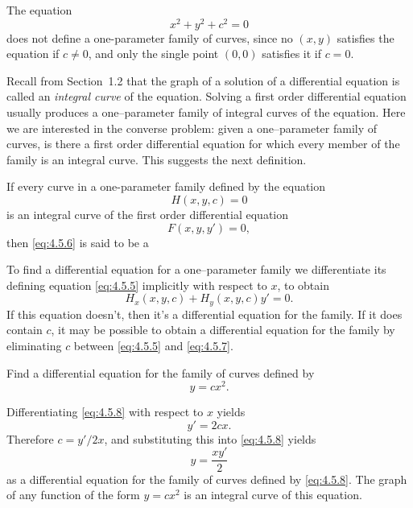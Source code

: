 \documentclass{ximera}
\begin{document}
\begin{example}\label{example:4.5.4}
 The equation
$$
x^2+y^2+c^2=0
$$
does not define a one-parameter family of curves, since no $(x,y)$
satisfies the equation if $c\neq 0$, and only the single point $(0,0)$
satisfies it if $c=0$.
\end{example}

Recall from Section~1.2 that the graph of a solution of a
differential equation is called an \textit{integral curve} of the
equation. Solving a first order differential equation usually produces
a one--parameter family of integral curves of the equation. Here we
are interested in the converse problem:
given a one--parameter family of curves, is there a first order
differential equation for which every  member of the family is an integral
curve.
This suggests the next definition.

\begin{definition}\label{thmtype:4.5.2}
If every curve in a one-parameter family defined by the equation
\begin{equation} \label{eq:4.5.5}
H(x,y,c)=0
\end{equation}
is an integral curve of the first order differential equation
\begin{equation} \label{eq:4.5.6}
F(x,y,y')=0,
\end{equation}
then  \eqref{eq:4.5.6} is said to be a 
\end{definition}

To find a differential equation for a one--parameter family we
differentiate its defining equation \eqref{eq:4.5.5} implicitly with
respect to $x$, to obtain
\begin{equation} \label{eq:4.5.7}
H_x(x,y,c)+H_y(x,y,c)y'=0.
\end{equation}
If this equation doesn't, then it's a differential
equation for the family. If it does contain $c$, it may be
possible to obtain a differential equation for the family by
eliminating $c$ between \eqref{eq:4.5.5} and \eqref{eq:4.5.7}.

\begin{example}\label{example:4.5.5}
Find a differential equation for the family of curves defined by
\begin{equation}  \label{eq:4.5.8}
y=cx^2.
\end{equation}


\begin{explanation} Differentiating
\eqref{eq:4.5.8} with respect to $x$ yields
$$
y'=2cx.
$$
 Therefore $c=y'/2x$, and substituting this into
\eqref{eq:4.5.8} yields
$$
y=\frac{xy'}{2}
$$
 as a differential equation for the family of
curves defined by \eqref{eq:4.5.8}.  The graph of any function of
the form $y=cx^2$ is an integral curve of this equation. \end{explanation}
\end{example}
\end{document}

